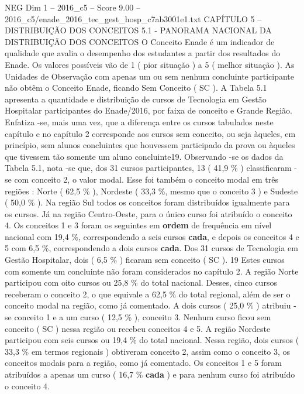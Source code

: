 \begin{textsample}{NEG Dim 1 – 2016\_c5 – Score 9.00 – 2016\_c5/enade\_2016\_tec\_gest\_hosp\_c7ab3001e1.txt}  \label{ex:f1_neg_367}
CAPÍTULO 5 – DISTRIBUIÇÃO DOS CONCEITOS 5.1 - PANORAMA NACIONAL DA DISTRIBUIÇÃO DOS CONCEITOS O Conceito Enade é um indicador de qualidade que avalia o desempenho dos estudantes a partir dos resultados do Enade.
Os valores possíveis vão de 1 ( pior situação ) a 5 ( melhor situação ).
As Unidades de Observação com apenas um ou sem nenhum concluinte participante não obtêm o Conceito Enade, ficando Sem Conceito ( SC ).
A Tabela 5.1 apresenta a quantidade e distribuição de cursos de Tecnologia em Gestão Hospitalar participantes do Enade/2016, por faixa de conceito e Grande Região.
Enfatiza -se, mais uma vez, que a diferença entre os cursos tabulados neste capítulo e no capítulo 2 corresponde aos cursos sem conceito, ou seja àqueles, em princípio, sem alunos concluintes que houvessem participado da prova ou àqueles que tivessem tão somente um aluno concluinte19.
Observando -se os dados da Tabela 5.1, nota -se que, dos 31 cursos participantes, 13 ( 41,9 \% ) classificaram -se com conceito 2, o valor modal.
Esse foi também o conceito modal em três regiões : Norte ( 62,5 \% ), Nordeste ( 33,3 \%, mesmo que o conceito 3 ) e Sudeste ( 50,0 \% ).
Na região Sul todos os conceitos foram distribuídos igualmente para os cursos.
Já na região Centro-Oeste, para o único curso foi atribuído o conceito 4.
Os conceitos 1 e 3 foram os seguintes em \textbf{ordem} de frequência em nível nacional com 19,4 \%, correspondendo a seis cursos \textbf{cada}, e depois os conceitos 4 e 5 com 6,5 \%, correspondendo a dois cursos \textbf{cada}.
Dos 31 cursos de Tecnologia em Gestão Hospitalar, dois ( 6,5 \% ) ficaram sem conceito ( SC ). 19 Estes cursos com somente um concluinte não foram considerados no capítulo 2.
A região Norte participou com oito cursos ou 25,8 \% do total nacional.
Desses, cinco cursos receberam o conceito 2, o que equivale a 62,5 \% do total regional, além de ser o conceito modal na região, como já comentado.
A dois cursos ( 25,0 \% ) atribuiu -se conceito 1 e a um curso ( 12,5 \% ), conceito 3.
Nenhum curso ficou sem conceito ( SC ) nessa região ou recebeu conceitos 4 e 5.
A região Nordeste participou com seis cursos ou 19,4 \% do total nacional.
Nessa região, dois cursos ( 33,3 \% em termos regionais ) obtiveram conceito 2, assim como o conceito 3, os conceitos modais para a região, como já comentado.
Os conceitos 1 e 5 foram atribuídos a apenas um curso ( 16,7 \% \textbf{cada} ) e para nenhum curso foi atribuído o conceito 4.

\end{textsample}
